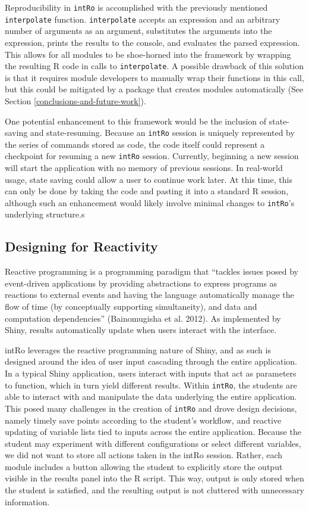 \documentclass[12pt,]{article}
\begin{document}
Reproducibility in \texttt{intRo} is accomplished with the previously
mentioned \texttt{interpolate} function. \texttt{interpolate} accepts an
expression and an arbitrary number of arguments as an argument,
substitutes the arguments into the expression, prints the results to the
console, and evaluates the parsed expression. This allows for all
modules to be shoe-horned into the framework by wrapping the resulting R
code in calls to \texttt{interpolate}. A possible drawback of this
solution is that it requires module developers to manually wrap their
functions in this call, but this could be mitigated by a package that
creates modules automatically (See Section
\ref{conclusions-and-future-work}).

One potential enhancement to this framework would be the inclusion of
state-saving and state-resuming. Because an \texttt{intRo} session is
uniquely represented by the series of commands stored as code, the code
itself could represent a checkpoint for resuming a new \texttt{intRo}
session. Currently, beginning a new session will start the application
with no memory of previous sessions. In real-world usage, state saving
could allow a user to continue work later. At this time, this can only
be done by taking the code and pasting it into a standard R session,
although such an enhancement would likely involve minimal changes to
\texttt{intRo}'s underlying structure.s

\subsection{Designing for Reactivity}\label{designing-for-reactivity}

Reactive programming is a programming paradigm that ``tackles issues
posed by event-driven applications by providing abstractions to express
programs as reactions to external events and having the language
automatically manage the flow of time (by conceptually supporting
simultaneity), and data and computation dependencies'' (Bainomugisha et
al. 2012). As implemented by Shiny, results automatically update when
users interact with the interface.

intRo leverages the reactive programming nature of Shiny, and as such is
designed around the idea of user input cascading through the entire
application. In a typical Shiny application, users interact with inputs
that act as parameters to function, which in turn yield different
results. Within \texttt{intRo}, the students are able to interact with
and manipulate the data underlying the entire application. This posed
many challenges in the creation of \texttt{intRo} and drove design
decisions, namely timely save points according to the student's
workflow, and reactive updating of variable lists tied to inputs across
the entire application. Because the student may experiment with
different configurations or select different variables, we did not want
to store all actions taken in the intRo session. Rather, each module
includes a button allowing the student to explicitly store the output
visible in the results panel into the R script. This way, output is only
stored when the student is satisfied, and the resulting output is not
cluttered with unnecessary information.
\end{document}
